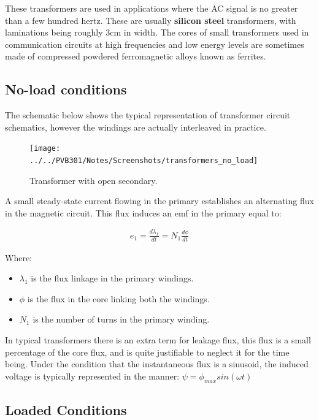 \documentclass{book}
\begin{document}
These transformers are used in applications where the AC signal is no greater than a few hundred hertz. These are usually \textbf{silicon steel} transformers, with laminations being roughly $3$cm in width. The cores of small transformers used in communication circuits at high frequencies
and low energy levels are sometimes made of compressed powdered ferromagnetic alloys known as ferrites.

\subsection{No-load conditions}

The schematic below shows the typical representation of transformer circuit schematics, however the windings are actually interleaved in practice.

\begin{figure}[h]
	\centering
	\texttt{[image: ../../PVB301/Notes/Screenshots/transformers\_no\_load]}
	\caption{Transformer with open secondary.}
	\label{fig:transformersnoload}
\end{figure}

A small steady-state current flowing in the primary establishes an alternating flux in the magnetic circuit. This flux induces an emf in the primary equal to:

\begin{align*}
	e_1 = \frac{d\lambda_1}{dt} = N_1 \frac{d \phi }{dt}
\end{align*}

Where:

\begin{itemize}
	\item $\lambda_1$ is the flux linkage in the primary windings.
	\item $\phi$ is the flux in the core linking both the windings.
	\item $N_1$ is the number of turns in the primary winding.
\end{itemize}

In typical transformers there is an extra term for leakage flux, this flux is a small percentage of the core flux, and is quite justifiable to neglect it for the time being. Under the condition that the instantaneous flux is a sinusoid, the induced voltage is typically represented in the manner: $\psi = \phi_{max} sin(\omega t)$

\subsection{Loaded Conditions}
\end{document}
